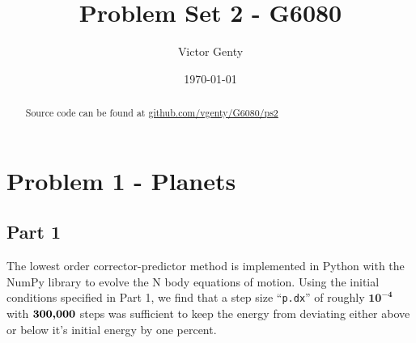\documentclass[singlepage,notitlepage,nofootinbib,11pt]{revtex4-1}
\begin{document}
\title{Problem Set 2 - G6080}
\author{Victor Genty}
\date{\today}
\begin{abstract}
\centering
Source code can be found at \href{https://github.com/vgenty/G6080/tree/master/ps2}{github.com/vgenty/G6080/ps2}
\end{abstract}
\maketitle
\section{Problem 1 - Planets}
\subsection{Part 1}
The lowest order corrector-predictor method is implemented in Python with the NumPy library to evolve the N body equations of motion. Using the initial conditions specified in Part 1, we find that a step size ``\verb|p.dx|'' of roughly $\mathbf{10^{-4}}$ with $\mathbf{300}\text{\bf{,}}\mathbf{000}$ steps was sufficient to keep the energy from deviating either above or below it's initial energy by one percent.
\end{document}
